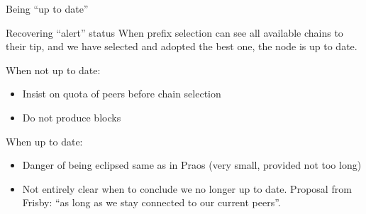 \documentclass[usenames,dvipsnames,t]{beamer}
\begin{document}
\begin{frame}{Being ``up to date''}

\begin{alertblock}{Recovering ``alert'' status}
When prefix selection can see all available chains to their tip, and we have
selected and adopted the best one, the node is up to date.
\end{alertblock}

\pause

When not up to date:

\begin{itemize}

\item Insist on quota of peers before chain selection

\item Do not produce blocks

\end{itemize}

\pause

When up to date:

\begin{itemize}

\item Danger of being eclipsed same as in Praos (very small, provided not too long)

\item Not entirely clear when to conclude we no longer up to date. Proposal from Frisby: ``as long as we stay connected to our current peers''.

\end{itemize}

\end{frame}
\end{document}
